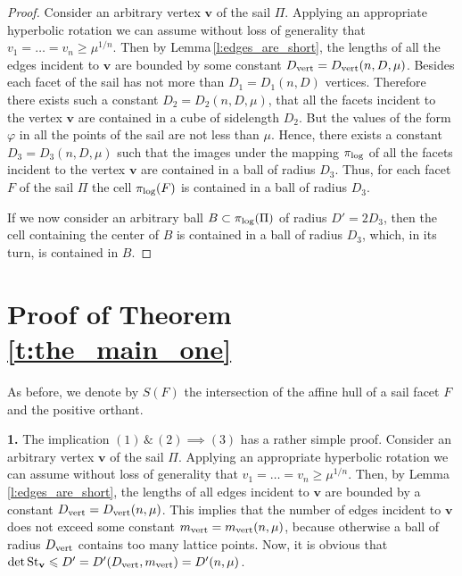 \documentclass[11pt]{article}
\theoremstyle{definition}
\theoremstyle{remark}
\theoremstyle{plain}
\renewcommand{\vec}[1]{\mathbf{#1}}
\renewcommand{\geq}{\geqslant}
\renewcommand{\leq}{\leqslant}
\newcommand{\starv}{\textup{St}_{\vec v}}
\newcommand{\sail}{\Pi}
\newcommand{\pilog}{\pi_{\textup{log}}}
\begin{document}
  \begin{proof}
    Consider an arbitrary vertex $\vec v$ of the sail $\sail$. Applying an appropriate
    hyperbolic rotation we can assume without loss of generality that
    $v_1=\ldots=v_n\geq\mu^{1/n}$. Then by Lemma\,\ref{l:edges_are_short}, the lengths of all
    the edges incident to $\vec v$ are bounded by some constant
    $D_{\textup{vert}}=D_{\textup{vert}}(n,D,\mu)$. Besides each facet of the sail has not
    more than $D_1=D_1(n,D)$ vertices. Therefore there exists such a constant
    $D_2=D_2(n,D,\mu)$, that all the facets incident to the vertex $\vec v$ are contained in
    a cube of sidelength $D_2$. But the values of the form $\varphi$ in all the points of the
    sail are not less than $\mu$. Hence, there exists a constant $D_3=D_3(n,D,\mu)$ such that
    the images under the mapping $\pilog$ of all the facets incident to the vertex $\vec v$
    are contained in a ball of radius $D_3$. Thus, for each facet $F$ of the sail $\sail$ the
    cell $\pilog(F)$ is contained in a ball of radius $D_3$.

    If we now consider an arbitrary ball $B\subset\pilog(\sail)$ of radius $D'=2D_3$, then
    the cell containing the center of $B$ is contained in a ball of radius $D_3$, which, in
    its turn, is contained in $B$.
  \end{proof}




  \section{Proof of Theorem\,\ref{t:the_main_one}}




  As before, we denote by $S(F)$ the intersection of the affine hull of a sail facet $F$
  and the positive orthant.

  {\bf 1.}
  The implication $(1)\,\&\,(2)\implies(3)$ has a rather simple proof. Consider an
  arbitrary vertex $\vec v$ of the sail $\sail$. Applying an appropriate hyperbolic
  rotation we can assume without loss of generality that $v_1=\ldots=v_n\geq\mu^{1/n}$.
  Then, by Lemma\,\ref{l:edges_are_short}, the lengths of all edges incident to $\vec v$ are
  bounded by a constant $D_{\textup{vert}}=D_{\textup{vert}}(n,\mu)$. This implies that the
  number of edges incident to $\vec v$ does not exceed some constant
  $m_{\textup{vert}}=m_{\textup{vert}}(n,\mu)$, because otherwise a ball of radius
  $D_{\textup{vert}}$ contains too many lattice points. Now, it is obvious that
  $\det\starv\leq D'=D'(D_{\textup{vert}},m_{\textup{vert}})=D'(n,\mu)$.
\end{document}
